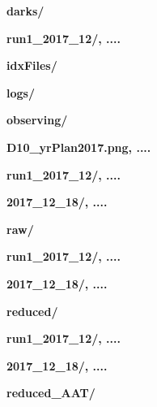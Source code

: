 \documentclass[12pt]{article}
\begin{document}
\hspace{10mm} \textbf{darks/} 
\vspace{1mm}

\hspace{15mm} \textbf{run1\_2017\_12/, ....}
\vspace{1mm}

\hspace{10mm} \textbf{idxFiles/} 
\vspace{1mm}

\hspace{10mm} \textbf{logs/} 
\vspace{1mm}

\hspace{10mm} \textbf{observing/} 
\vspace{1mm}

\hspace{15mm} \textbf{D10\_yrPlan2017.png, ....} 
\vspace{1mm}

\hspace{15mm} \textbf{run1\_2017\_12/, ....} 
\vspace{1mm}

\hspace{20mm} \textbf{2017\_12\_18/, ....}
\vspace{1mm}

\hspace{10mm} \textbf{raw/} 
\vspace{1mm}

\hspace{15mm} \textbf{run1\_2017\_12/, ....} 
\vspace{1mm}

\hspace{20mm} \textbf{2017\_12\_18/, ....} 
\vspace{1mm}

\hspace{10mm} \textbf{reduced/}
\vspace{1mm}

\hspace{15mm} \textbf{run1\_2017\_12/, ....} 
\vspace{1mm}

\hspace{20mm} \textbf{2017\_12\_18/, ....}
\vspace{1mm}

\hspace{10mm} \textbf{reduced\_AAT/}
\vspace{1mm}
\end{document}

